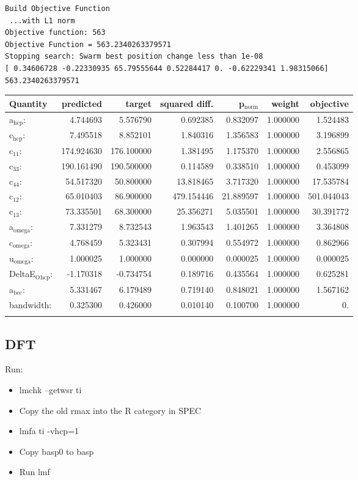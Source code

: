 \documentclass[11pt]{article}
\begin{document}
\begin{verbatim}
Build Objective Function
 ...with L1 norm 
Objective function: 563 
Objective Function = 563.2340263379571 
Stopping search: Swarm best position change less than 1e-08 
[ 0.34606728 -0.22330935 65.79555644 0.52284417 0. -0.62229341 1.98315066] 
563.2340263379571
\end{verbatim}

\begin{center}
\begin{tabular}{lrrrrrr}
Quantity & predicted & target & squared diff. & p$_{\text{norm}}$ & weight & objective\\
\hline
a$_{\text{hcp}}$: & 4.744693 & 5.576790 & 0.692385 & 0.832097 & 1.000000 & 1.524483\\
c$_{\text{hcp}}$: & 7.495518 & 8.852101 & 1.840316 & 1.356583 & 1.000000 & 3.196899\\
c$_{\text{11}}$: & 174.924630 & 176.100000 & 1.381495 & 1.175370 & 1.000000 & 2.556865\\
c$_{\text{33}}$: & 190.161490 & 190.500000 & 0.114589 & 0.338510 & 1.000000 & 0.453099\\
c$_{\text{44}}$: & 54.517320 & 50.800000 & 13.818465 & 3.717320 & 1.000000 & 17.535784\\
c$_{\text{12}}$: & 65.010403 & 86.900000 & 479.154446 & 21.889597 & 1.000000 & 501.044043\\
c$_{\text{13}}$: & 73.335501 & 68.300000 & 25.356271 & 5.035501 & 1.000000 & 30.391772\\
a$_{\text{omega}}$: & 7.331279 & 8.732543 & 1.963543 & 1.401265 & 1.000000 & 3.364808\\
c$_{\text{omega}}$: & 4.768459 & 5.323431 & 0.307994 & 0.554972 & 1.000000 & 0.862966\\
u$_{\text{omega}}$: & 1.000025 & 1.000000 & 0.000000 & 0.000025 & 1.000000 & 0.000025\\
DeltaE$_{\text{O}}$$_{\text{hcp}}$: & -1.170318 & -0.734754 & 0.189716 & 0.435564 & 1.000000 & 0.625281\\
a$_{\text{bcc}}$: & 5.331467 & 6.179489 & 0.719140 & 0.848021 & 1.000000 & 1.567162\\
bandwidth: & 0.325300 & 0.426000 & 0.010140 & 0.100700 & 1.000000 & 0.\\
 &  &  &  &  &  & \\
\end{tabular}
\end{center}
\subsection{DFT}
\label{sec-2-8}
Run:
\begin{itemize}
\item lmchk --getwsr ti
\item Copy the old rmax into the R category in SPEC
\item lmfa ti -vhcp=1
\item Copy basp0 to basp
\item Run lmf
\end{itemize}
\end{document}
